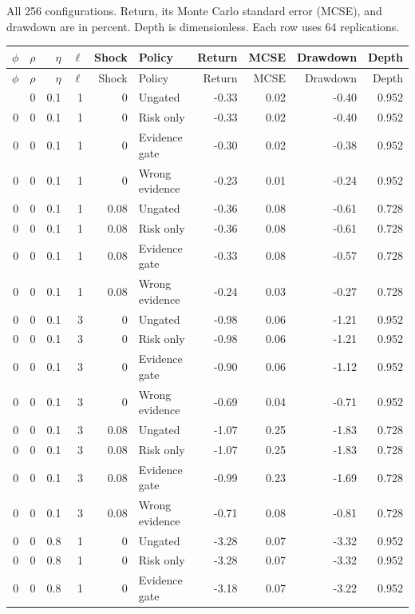 All 256 configurations. Return, its Monte Carlo standard error (MCSE), and drawdown are in percent. Depth is dimensionless. Each row uses 64 replications.
\begingroup\footnotesize\setlength{\tabcolsep}{4pt}
\begin{longtable}{rrrrrlrrrr}\toprule
$\phi$ & $\rho$ & $\eta$ & $\ell$ & Shock & Policy & Return & MCSE & Drawdown & Depth\\\midrule\endfirsthead
\toprule $\phi$ & $\rho$ & $\eta$ & $\ell$ & Shock & Policy & Return & MCSE & Drawdown & Depth\\\midrule\endhead
\bottomrule\endfoot
0 & 0 & 0.1 & 1 & 0 & Ungated & -0.33 & 0.02 & -0.40 & 0.952\\
0 & 0 & 0.1 & 1 & 0 & Risk only & -0.33 & 0.02 & -0.40 & 0.952\\
0 & 0 & 0.1 & 1 & 0 & Evidence gate & -0.30 & 0.02 & -0.38 & 0.952\\
0 & 0 & 0.1 & 1 & 0 & Wrong evidence & -0.23 & 0.01 & -0.24 & 0.952\\
0 & 0 & 0.1 & 1 & 0.08 & Ungated & -0.36 & 0.08 & -0.61 & 0.728\\
0 & 0 & 0.1 & 1 & 0.08 & Risk only & -0.36 & 0.08 & -0.61 & 0.728\\
0 & 0 & 0.1 & 1 & 0.08 & Evidence gate & -0.33 & 0.08 & -0.57 & 0.728\\
0 & 0 & 0.1 & 1 & 0.08 & Wrong evidence & -0.24 & 0.03 & -0.27 & 0.728\\
0 & 0 & 0.1 & 3 & 0 & Ungated & -0.98 & 0.06 & -1.21 & 0.952\\
0 & 0 & 0.1 & 3 & 0 & Risk only & -0.98 & 0.06 & -1.21 & 0.952\\
0 & 0 & 0.1 & 3 & 0 & Evidence gate & -0.90 & 0.06 & -1.12 & 0.952\\
0 & 0 & 0.1 & 3 & 0 & Wrong evidence & -0.69 & 0.04 & -0.71 & 0.952\\
0 & 0 & 0.1 & 3 & 0.08 & Ungated & -1.07 & 0.25 & -1.83 & 0.728\\
0 & 0 & 0.1 & 3 & 0.08 & Risk only & -1.07 & 0.25 & -1.83 & 0.728\\
0 & 0 & 0.1 & 3 & 0.08 & Evidence gate & -0.99 & 0.23 & -1.69 & 0.728\\
0 & 0 & 0.1 & 3 & 0.08 & Wrong evidence & -0.71 & 0.08 & -0.81 & 0.728\\
0 & 0 & 0.8 & 1 & 0 & Ungated & -3.28 & 0.07 & -3.32 & 0.952\\
0 & 0 & 0.8 & 1 & 0 & Risk only & -3.28 & 0.07 & -3.32 & 0.952\\
0 & 0 & 0.8 & 1 & 0 & Evidence gate & -3.18 & 0.07 & -3.22 & 0.952\\

\end{longtable}
